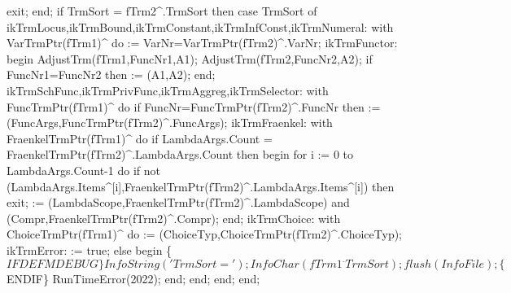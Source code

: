          exit;
      end;
      if TrmSort = fTrm2^.TrmSort then
         case TrmSort of
            ikTrmLocus,ikTrmBound,ikTrmConstant,ikTrmInfConst,ikTrmNumeral:
               with VarTrmPtr(fTrm1)^ do
                   := VarNr=VarTrmPtr(fTrm2)^.VarNr;
            ikTrmFunctor:
               begin
                  AdjustTrm(fTrm1,FuncNr1,A1);
                  AdjustTrm(fTrm2,FuncNr2,A2);
                  if FuncNr1=FuncNr2 then  := (A1,A2);
               end;
            ikTrmSchFunc,ikTrmPrivFunc,ikTrmAggreg,ikTrmSelector:
               with FuncTrmPtr(fTrm1)^ do
                  if FuncNr=FuncTrmPtr(fTrm2)^.FuncNr then
                      := (FuncArgs,FuncTrmPtr(fTrm2)^.FuncArgs);
            ikTrmFraenkel:
               with FraenkelTrmPtr(fTrm1)^ do
                  if LambdaArgs.Count = FraenkelTrmPtr(fTrm2)^.LambdaArgs.Count then
                  begin
                     for i := 0 to LambdaArgs.Count-1 do
                        if not (LambdaArgs.Items^[i],FraenkelTrmPtr(fTrm2)^.LambdaArgs.Items^[i]) then
                           exit;
                      := (LambdaScope,FraenkelTrmPtr(fTrm2)^.LambdaScope)
                        and (Compr,FraenkelTrmPtr(fTrm2)^.Compr);
                  end;
            ikTrmChoice:
               with ChoiceTrmPtr(fTrm1)^ do
                := (ChoiceTyp,ChoiceTrmPtr(fTrm2)^.ChoiceTyp);
            ikTrmError:  := true;
         else
         begin
            \{$IFDEF MDEBUG\}
            InfoString('TrmSort='); InfoChar(fTrm1^.TrmSort); flush(InfoFile);
            \{$ENDIF\}
            RunTimeError(2022);
         end;
         end;
   end;
end;
\eatline
